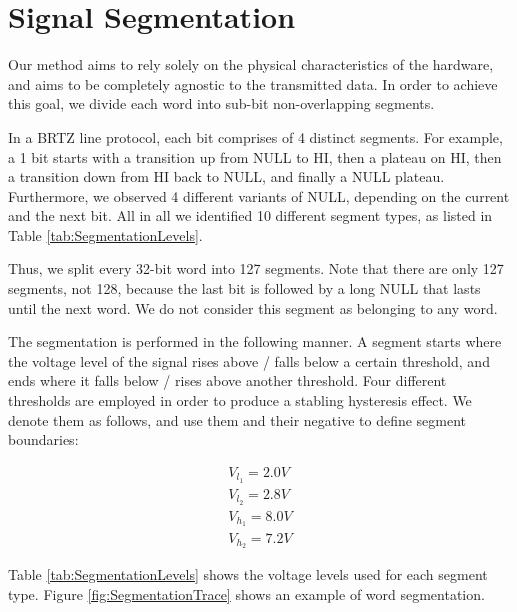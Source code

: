 \documentclass[conference]{IEEEtran}
\begin{document}


\section{Signal Segmentation} \label{SignalSegmentation}
  Our method aims to rely solely on the physical characteristics of the hardware, and aims to be completely agnostic to the transmitted data. In order to achieve this goal, we divide each word into sub-bit non-overlapping segments.
  
  In a BRTZ line protocol, each bit comprises of 4 distinct segments. For example, a 1 bit starts with a transition up from NULL to HI, then a plateau on HI, then a transition down from HI back to NULL, and finally a NULL plateau. Furthermore, we observed 4 different variants of NULL, depending on the current and the next bit. All in all we identified 10 different segment types, as listed in Table \ref{tab:SegmentationLevels}.
  
  Thus, we split every 32-bit word into 127 segments. Note that there are only 127 segments, not 128, because the last bit is followed by a long NULL that lasts until the next word. We do not consider this segment as belonging to any word.
  
  The segmentation is performed in the following manner. A segment starts where the voltage level of the signal rises above / falls below a certain threshold, and ends where it falls below / rises above another threshold. Four different thresholds are employed in order to produce a stabling hysteresis effect. We denote them as follows, and use them and their negative to define segment boundaries:
  
  \begin{align*}
    V_{l_1} = 2.0V \\
    V_{l_2} = 2.8V \\
    V_{h_1} = 8.0V \\
    V_{h_2} = 7.2V 
  \end{align*}
  
  Table \ref{tab:SegmentationLevels} shows the voltage levels used for each segment type. Figure \ref{fig:SegmentationTrace} shows an example of word segmentation.
  
\end{document}

